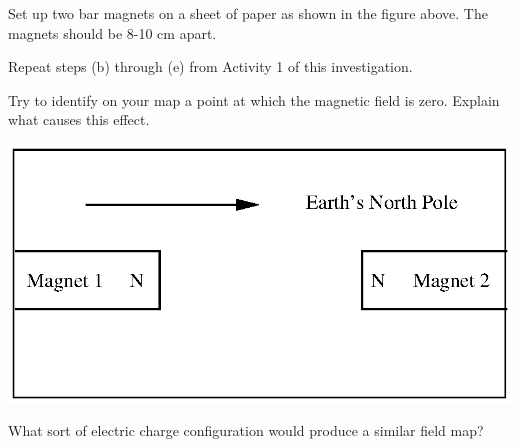 \begin{enumerate}[labparts]
\begin{minipage}{0.49\textwidth}
\item Set up two bar magnets on a sheet of paper as shown in the figure
above. The magnets should be 8-10 cm apart.
\item Repeat steps (b) through (e) from Activity 1 of this investigation.
\item Try to identify on your map a point at which the magnetic field is
zero. Explain what causes this effect.
\vspace{2mm}
\end{minipage}
\begin{minipage}{0.45\textwidth}
\hspace{0.25in}\includegraphics[width=\textwidth]{magnetism_field_perm_mag/magnetism_2_fig_3.eps}
\end{minipage}
\answerspace{30mm}


\item What sort of electric charge configuration would produce a similar
field map?\vspace{15mm}
\end{enumerate}

